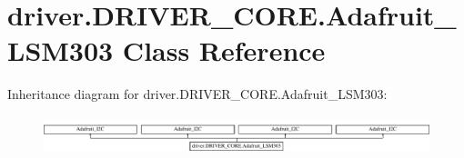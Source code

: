 \hypertarget{classdriver_1_1DRIVER__CORE_1_1Adafruit__LSM303}{}\section{driver.\+D\+R\+I\+V\+E\+R\+\_\+\+C\+O\+R\+E.\+Adafruit\+\_\+\+L\+S\+M303 Class Reference}
\label{classdriver_1_1DRIVER__CORE_1_1Adafruit__LSM303}
Inheritance diagram for driver.\+D\+R\+I\+V\+E\+R\+\_\+\+C\+O\+R\+E.\+Adafruit\+\_\+\+L\+S\+M303\+:\begin{figure}[H]
\begin{center}
\leavevmode
\includegraphics[height=1.129032cm]{classdriver_1_1DRIVER__CORE_1_1Adafruit__LSM303}
\end{center}
\end{figure}

